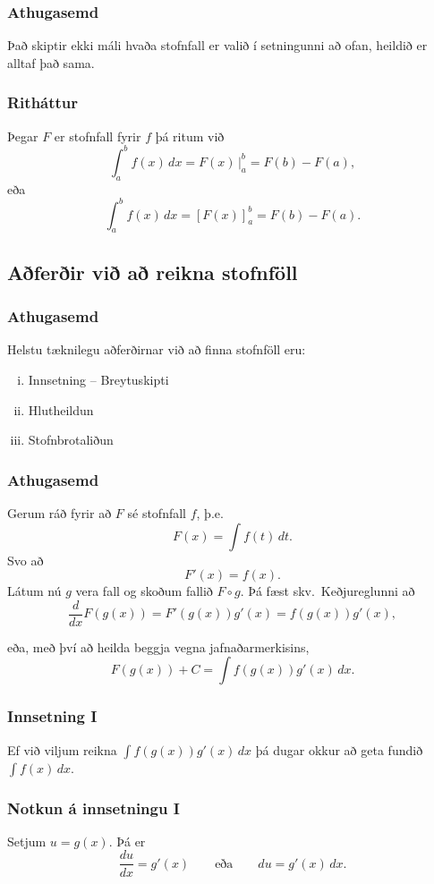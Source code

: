 \documentclass[icelandic,a4paper,12pt]{article}
\begin{document}
\subsubsection{Athugasemd}
Það skiptir ekki máli hvaða stofnfall er valið í setningunni að ofan, heildið er alltaf það sama.

\subsubsection{Ritháttur}
Þegar $F$ er stofnfall fyrir $f$ þá ritum við 
$$
  \int_a^b f(x)\,dx=F(x)\,\bigg|_a^b= F(b)-F(a),
$$
eða 
$$
  \int_a^b f(x)\,dx=\left[F(x)\right]_a^b= F(b)-F(a).
$$

\subsection{Aðferðir við að reikna stofnföll}
\subsubsection{Athugasemd}
Helstu tæknilegu aðferðirnar við að finna stofnföll eru:
\begin{enumerate}[(i)]
\item Innsetning -- Breytuskipti 
\item Hlutheildun 
\item Stofnbrotaliðun 
\end{enumerate}

\subsubsection{Athugasemd}
Gerum ráð fyrir að $F$ sé stofnfall $f$, þ.e. $$F(x)=\int f(t)\,dt.$$
Svo að 
$$F'(x)=f(x).$$
Látum nú $g$ vera fall og skoðum fallið $F\circ g$. 
Þá fæst skv.~Keðjureglunni að 
$$\frac{d}{dx}F(g(x))=F'(g(x))g'(x) = f(g(x))g'(x),$$

eða, með því að heilda beggja vegna jafnaðarmerkisins, 
$$
F(g(x))+C = \int f(g(x))g'(x)\,dx.
$$

\subsubsection{Innsetning I}
Ef við viljum reikna $\int f(g(x))g'(x)\, dx$ þá dugar okkur
að geta fundið $\int f(x)\, dx$.

\subsubsection{Notkun á innsetningu I}
Setjum $u=g(x)$.  Þá er
$$
\frac{du}{dx}=g'(x)\qquad \text{eða} \qquad du=g'(x)\,dx.
$$
\end{document}
